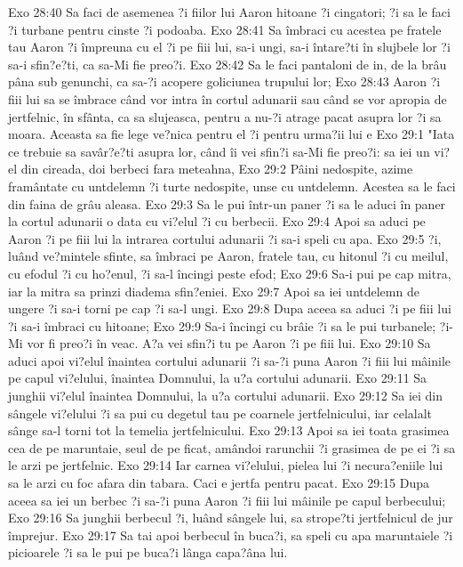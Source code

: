 Exo 28:40  Sa faci de asemenea ?i fiilor lui Aaron hitoane ?i cingatori; ?i sa le faci ?i turbane pentru cinste ?i podoaba.
Exo 28:41  Sa îmbraci cu acestea pe fratele tau Aaron ?i împreuna cu el ?i pe fiii lui, sa-i ungi, sa-i întare?ti în slujbele lor ?i sa-i sfin?e?ti, ca sa-Mi fie preo?i.
Exo 28:42  Sa le faci pantaloni de in, de la brâu pâna sub genunchi, ca sa-?i acopere goliciunea trupului lor;
Exo 28:43  Aaron ?i fiii lui sa se îmbrace când vor intra în cortul adunarii sau când se vor apropia de jertfelnic, în sfânta, ca sa slujeasca, pentru a nu-?i atrage pacat asupra lor ?i sa moara. Aceasta sa fie lege ve?nica pentru el ?i pentru urma?ii lui e
Exo 29:1  "Iata ce trebuie sa savâr?e?ti asupra lor, când îi vei sfin?i sa-Mi fie preo?i: sa iei un vi?el din cireada, doi berbeci fara meteahna,
Exo 29:2  Pâini nedospite, azime framântate cu untdelemn ?i turte nedospite, unse cu untdelemn. Acestea sa le faci din faina de grâu aleasa.
Exo 29:3  Sa le pui într-un paner ?i sa le aduci în paner la cortul adunarii o data cu vi?elul ?i cu berbecii.
Exo 29:4  Apoi sa aduci pe Aaron ?i pe fiii lui la intrarea cortului adunarii ?i sa-i speli cu apa.
Exo 29:5  ?i, luând ve?mintele sfinte, sa îmbraci pe Aaron, fratele tau, cu hitonul ?i cu meilul, cu efodul ?i cu ho?enul, ?i sa-l încingi peste efod;
Exo 29:6  Sa-i pui pe cap mitra, iar la mitra sa prinzi diadema sfin?eniei.
Exo 29:7  Apoi sa iei untdelemn de ungere ?i sa-i torni pe cap ?i sa-l ungi.
Exo 29:8  Dupa aceea sa aduci ?i pe fiii lui ?i sa-i îmbraci cu hitoane;
Exo 29:9  Sa-i încingi cu brâie ?i sa le pui turbanele; ?i-Mi vor fi preo?i în veac. A?a vei sfin?i tu pe Aaron ?i pe fiii lui.
Exo 29:10  Sa aduci apoi vi?elul înaintea cortului adunarii ?i sa-?i puna Aaron ?i fiii lui mâinile pe capul vi?elului, înaintea Domnului, la u?a cortului adunarii.
Exo 29:11  Sa junghii vi?elul înaintea Domnului, la u?a cortului adunarii.
Exo 29:12  Sa iei din sângele vi?elului ?i sa pui cu degetul tau pe coarnele jertfelnicului, iar celalalt sânge sa-l torni tot la temelia jertfelnicului.
Exo 29:13  Apoi sa iei toata grasimea cea de pe maruntaie, seul de pe ficat, amândoi rarunchii ?i grasimea de pe ei ?i sa le arzi pe jertfelnic.
Exo 29:14  Iar carnea vi?elului, pielea lui ?i necura?eniile lui sa le arzi cu foc afara din tabara. Caci e jertfa pentru pacat.
Exo 29:15  Dupa aceea sa iei un berbec ?i sa-?i puna Aaron ?i fiii lui mâinile pe capul berbecului;
Exo 29:16  Sa junghii berbecul ?i, luând sângele lui, sa strope?ti jertfelnicul de jur împrejur.
Exo 29:17  Sa tai apoi berbecul în buca?i, sa speli cu apa maruntaiele ?i picioarele ?i sa le pui pe buca?i lânga capa?âna lui.
